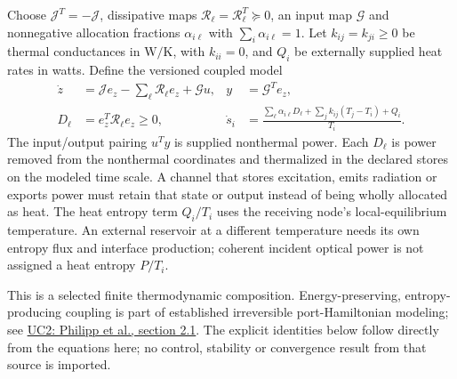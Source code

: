 Choose $\mathcal J^T=-\mathcal J$, dissipative maps
$\mathcal R_\ell=\mathcal R_\ell^T\succeq0$, an input map $\mathcal G$ and
nonnegative allocation fractions $\alpha_{i\ell}$ with
$\sum_i\alpha_{i\ell}=1$. Let $k_{ij}=k_{ji}\ge0$ be thermal conductances
in $\mathrm{W/K}$, with $k_{ii}=0$, and $Q_i$ be externally supplied heat
rates in watts. Define the versioned coupled model
\begin{align}
 \dot z&=\mathcal J e_z-\sum_\ell\mathcal R_\ell e_z+\mathcal G u,
 &y&=\mathcal G^T e_z,\nonumber\\
 D_\ell&=e_z^T\mathcal R_\ell e_z\ge0,
 &\dot s_i&=\frac{\displaystyle\sum_\ell\alpha_{i\ell}D_\ell
              +\displaystyle\sum_j k_{ij}(T_j-T_i)+Q_i}{T_i}.
 \label{eq:r14-coupled-state}
\end{align}
The input/output pairing $u^Ty$ is supplied nonthermal power. Each $D_\ell$
is power removed from the nonthermal coordinates and thermalized in the
declared stores on the modeled time scale. A channel that stores excitation,
emits radiation or exports power must retain that state or output instead of
being wholly allocated as heat. The heat entropy term $Q_i/T_i$ uses the
receiving node's local-equilibrium temperature. An external reservoir at a
different temperature needs its own entropy flux and interface production;
coherent incident optical power is not assigned a heat entropy $P/T_i$.

This is a selected finite thermodynamic composition. Energy-preserving,
entropy-producing coupling is part of established irreversible
port-Hamiltonian modeling; see
\href{https://arxiv.org/html/2306.08914v2#S2.SS1}
{UC2: Philipp et al., section 2.1}.
The explicit identities below follow directly from the equations here; no
control, stability or convergence result from that source is imported.


